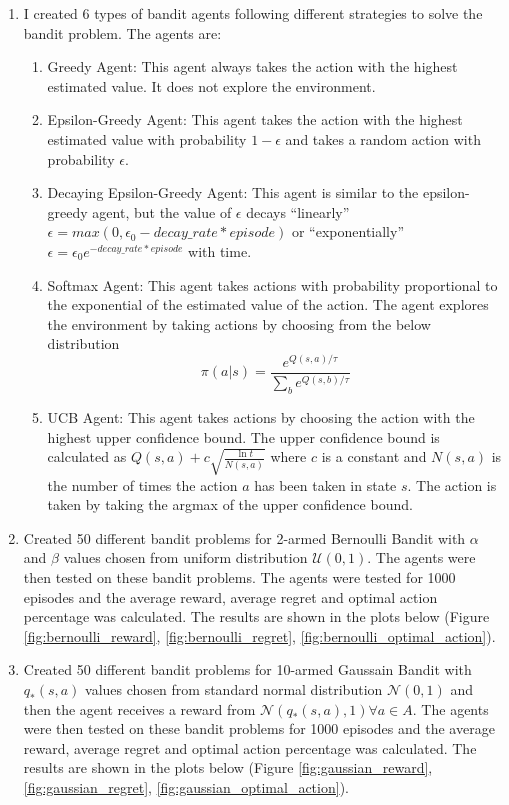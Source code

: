 \begin{enumerate}
    \item I created 6 types of bandit agents following different strategies to solve the bandit problem. The agents are:
    \begin{enumerate}
        \item Greedy Agent: This agent always takes the action with the highest estimated value. It does not explore the environment.
        \item Epsilon-Greedy Agent: This agent takes the action with the highest estimated value with probability $1-\epsilon$ and takes a random action with probability $\epsilon$.
        \item Decaying Epsilon-Greedy Agent: This agent is similar to the epsilon-greedy agent, but the value of $\epsilon$ decays ``linearly'' $\epsilon=max(0, \epsilon_0 - decay\_rate * episode)$ or ``exponentially'' $\epsilon=\epsilon_0e^{-decay\_rate*episode}$ with time. 
        \item Softmax Agent: This agent takes actions with probability proportional to the exponential of the estimated value of the action. The agent explores the environment by taking actions by choosing from the below distribution
        \begin{equation}
            \pi(a|s) = \frac{e^{Q(s,a)/\tau}}{\sum_{b}e^{Q(s,b)/\tau}}
        \end{equation}
        \item UCB Agent: This agent takes actions by choosing the action with the highest upper confidence bound. The upper confidence bound is calculated as $Q(s,a) + c\sqrt{\frac{\ln t}{N(s,a)}}$ where $c$ is a constant and $N(s,a)$ is the number of times the action $a$ has been taken in state $s$. The action is taken by taking the argmax of the upper confidence bound. 
    \end{enumerate}
    
    \item Created 50 different bandit problems for 2-armed Bernoulli Bandit with $\alpha$ and $\beta$ values chosen from uniform distribution $\mathcal{U}(0, 1)$. The agents were then tested on these bandit problems. The agents were tested for 1000 episodes and the average reward, average regret and optimal action percentage was calculated. The results are shown in the plots below (Figure \ref{fig:bernoulli_reward}, \ref{fig:bernoulli_regret}, \ref{fig:bernoulli_optimal_action}). 
    
    \item Created 50 different bandit problems for 10-armed Gaussain Bandit with $q_*(s, a)$ values chosen from standard normal distribution $\mathcal{N}(0, 1)$ and then the agent receives a reward from $\mathcal{N}(q_*(s, a), 1) \forall a \in A$. The agents were then tested on these bandit problems for 1000 episodes and the average reward, average regret and optimal action percentage was calculated. The results are shown in the plots below (Figure \ref{fig:gaussian_reward}, \ref{fig:gaussian_regret}, \ref{fig:gaussian_optimal_action}).
    

\end{enumerate}
